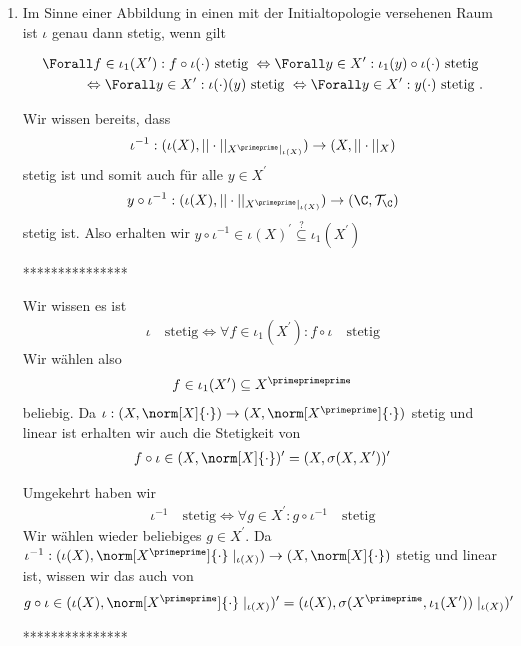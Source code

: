 \begin{solution}
\begin{enumerate}[label = (\arabic*)]
  ***************

  \item

  Im Sinne einer Abbildung in einen mit der Initialtopologie versehenen Raum ist $\iota$ genau dann stetig, wenn gilt

  \begin{align*}
    \Forall f \in \iota_1(X^{\prime}): f \circ \iota(\cdot) \text{~stetig~} \Leftrightarrow \Forall y \in X^{\prime}: \iota_1 (y) \circ \iota(\cdot) \text{~stetig~} \\
     \Leftrightarrow \Forall y \in X^{\prime}: \iota(\cdot)(y) \text{~stetig~} \Leftrightarrow \Forall y \in X^{\prime}: y(\cdot) \text{~stetig~}.
  \end{align*}

  Wir wissen bereits, dass
  \begin{align*}
    \iota^{-1}: (\iota(X),||\cdot||_{X^{\primeprime}|_{\iota(X)}}) \rightarrow (X,||\cdot||_X)
  \end{align*}
  stetig ist und somit auch für alle $y \in X^{\prime}$
  \begin{align*}
    y \circ \iota^{-1}: (\iota(X),||\cdot||_{X^{\primeprime}|_{\iota(X)}}) \rightarrow (\C,\mathcal{T}_\C)
  \end{align*}
  stetig ist. Also erhalten wir $y \circ \iota^{-1} \in \iota(X)^{\prime} \stackrel{?}{\subseteq} \iota_1(X^{\prime})$

  ***************

  Wir wissen es ist
  \begin{align*}
    \iota \quad \textrm{stetig} \Leftrightarrow \forall f \in \iota_1(X^\prime): f \circ \iota \quad \textrm{stetig}
  \end{align*}
  Wir wählen also 
  \begin{align*}
    f \in \iota_1(X^\prime) \subseteq X^\primeprimeprime 
  \end{align*}
  beliebig. Da $\iota: (X, \norm[X]{\cdot}) \to (X, \norm[X^\primeprime]{\cdot})$ stetig und linear ist erhalten wir auch die Stetigkeit von 
  \begin{align*}
    f \circ \iota \in (X, \norm[X]{\cdot})^\prime = (X, \sigma(X, X^\prime))^\prime
  \end{align*}

  Umgekehrt haben wir
  \begin{align*}
    \iota^{-1} \quad \textrm{stetig} \Leftrightarrow \forall g \in X^{\prime}: g \circ \iota^{-1} \quad \textrm{stetig}
  \end{align*}
  Wir wählen wieder beliebiges $g \in X^\prime$. Da $\iota^{-1}: (\iota(X), \norm[X^\primeprime]{\cdot}\mid_{\iota(X)}) \to (X, \norm[X]{\cdot})$ stetig und linear ist, wissen wir das auch von
  \begin{align*}
    g \circ \iota \in (\iota(X), \norm[X^\primeprime]{\cdot}\mid_{\iota(X)})^\prime = (\iota(X), \sigma(X^\primeprime, \iota_1(X^\prime))\mid_{\iota(X)})^\prime
  \end{align*}

  ***************

\end{enumerate}


\end{solution}
